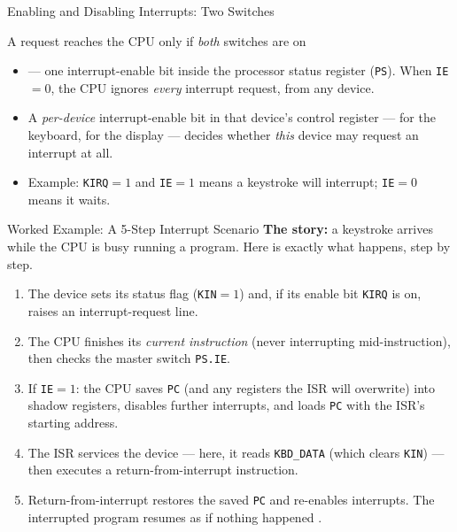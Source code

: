\documentclass[aspectratio=169]{beamer}
\begin{document}
\begin{frame}{Enabling and Disabling Interrupts: Two Switches}
  \begin{block}{A request reaches the CPU only if \emph{both} switches are on}
    \begin{itemize}
      \item {} --- one interrupt-enable bit inside the
        processor status register (\texttt{PS}). When \texttt{IE}$=0$, the
        CPU ignores \emph{every} interrupt request, from any device.
      \item A \emph{per-device} interrupt-enable bit in that device's control
        register ---  for the keyboard, 
        for the display --- decides whether \emph{this} device may request an
        interrupt at all.
    \end{itemize}
  \end{block}
  \begin{itemize}
    \item Example: \texttt{KIRQ}$=1$ and \texttt{IE}$=1$ means a keystroke
      will interrupt; \texttt{IE}$=0$ means it waits.
  \end{itemize}
\end{frame}

\begin{frame}{Worked Example: A 5-Step Interrupt Scenario}
  \footnotesize
  \textbf{The story:} a keystroke arrives while the CPU is busy running a
  program. Here is exactly what happens, step by step.
  \begin{enumerate}
    \item The device sets its status flag (\texttt{KIN}$=1$) and, if its
      enable bit \texttt{KIRQ} is on, raises an interrupt-request line.
    \item The CPU finishes its \emph{current instruction} (never interrupting
      mid-instruction), then checks the master switch \texttt{PS.IE}.
    \item If \texttt{IE}$=1$: the CPU saves \texttt{PC} (and any registers the
      ISR will overwrite) into shadow registers, disables further interrupts,
      and loads \texttt{PC} with the ISR's starting address.
    \item The ISR services the device --- here, it reads \texttt{KBD\_DATA}
      (which clears \texttt{KIN}) --- then executes a return-from-interrupt
      instruction.
    \item Return-from-interrupt restores the saved \texttt{PC} and re-enables
      interrupts. The interrupted program resumes as if nothing happened
      \cite{Hamacher2002_computer_organization}.
  \end{enumerate}
  \vspace{0.2cm}
\end{frame}
\end{document}
